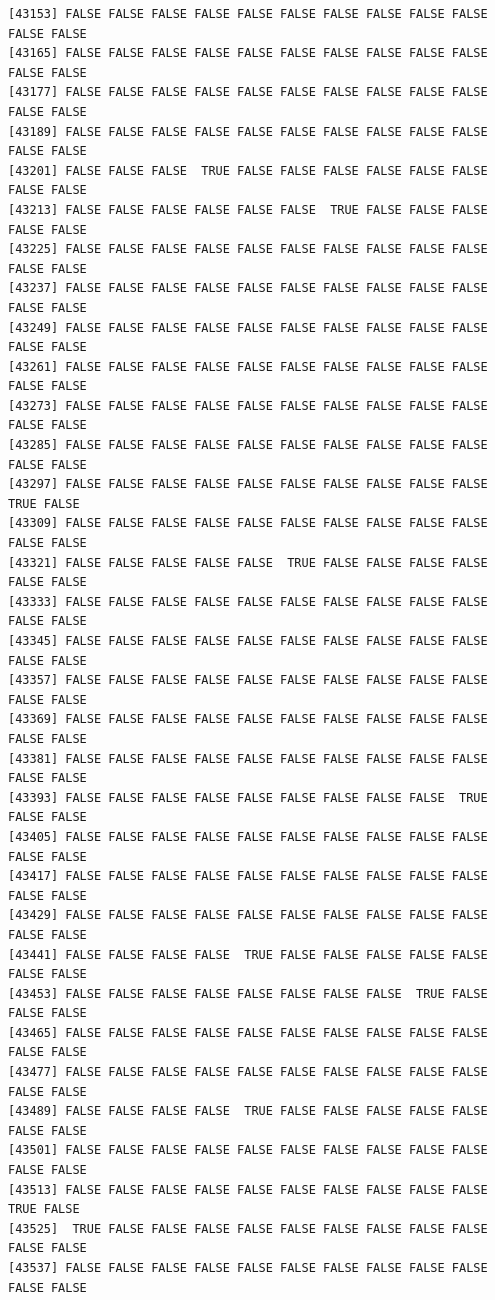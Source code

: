 \documentclass[
  a4paper,
  DIV=11,
  numbers=noendperiod]{scrartcl}
\begin{document}
\begin{verbatim}
[43153] FALSE FALSE FALSE FALSE FALSE FALSE FALSE FALSE FALSE FALSE FALSE FALSE
[43165] FALSE FALSE FALSE FALSE FALSE FALSE FALSE FALSE FALSE FALSE FALSE FALSE
[43177] FALSE FALSE FALSE FALSE FALSE FALSE FALSE FALSE FALSE FALSE FALSE FALSE
[43189] FALSE FALSE FALSE FALSE FALSE FALSE FALSE FALSE FALSE FALSE FALSE FALSE
[43201] FALSE FALSE FALSE  TRUE FALSE FALSE FALSE FALSE FALSE FALSE FALSE FALSE
[43213] FALSE FALSE FALSE FALSE FALSE FALSE  TRUE FALSE FALSE FALSE FALSE FALSE
[43225] FALSE FALSE FALSE FALSE FALSE FALSE FALSE FALSE FALSE FALSE FALSE FALSE
[43237] FALSE FALSE FALSE FALSE FALSE FALSE FALSE FALSE FALSE FALSE FALSE FALSE
[43249] FALSE FALSE FALSE FALSE FALSE FALSE FALSE FALSE FALSE FALSE FALSE FALSE
[43261] FALSE FALSE FALSE FALSE FALSE FALSE FALSE FALSE FALSE FALSE FALSE FALSE
[43273] FALSE FALSE FALSE FALSE FALSE FALSE FALSE FALSE FALSE FALSE FALSE FALSE
[43285] FALSE FALSE FALSE FALSE FALSE FALSE FALSE FALSE FALSE FALSE FALSE FALSE
[43297] FALSE FALSE FALSE FALSE FALSE FALSE FALSE FALSE FALSE FALSE  TRUE FALSE
[43309] FALSE FALSE FALSE FALSE FALSE FALSE FALSE FALSE FALSE FALSE FALSE FALSE
[43321] FALSE FALSE FALSE FALSE FALSE  TRUE FALSE FALSE FALSE FALSE FALSE FALSE
[43333] FALSE FALSE FALSE FALSE FALSE FALSE FALSE FALSE FALSE FALSE FALSE FALSE
[43345] FALSE FALSE FALSE FALSE FALSE FALSE FALSE FALSE FALSE FALSE FALSE FALSE
[43357] FALSE FALSE FALSE FALSE FALSE FALSE FALSE FALSE FALSE FALSE FALSE FALSE
[43369] FALSE FALSE FALSE FALSE FALSE FALSE FALSE FALSE FALSE FALSE FALSE FALSE
[43381] FALSE FALSE FALSE FALSE FALSE FALSE FALSE FALSE FALSE FALSE FALSE FALSE
[43393] FALSE FALSE FALSE FALSE FALSE FALSE FALSE FALSE FALSE  TRUE FALSE FALSE
[43405] FALSE FALSE FALSE FALSE FALSE FALSE FALSE FALSE FALSE FALSE FALSE FALSE
[43417] FALSE FALSE FALSE FALSE FALSE FALSE FALSE FALSE FALSE FALSE FALSE FALSE
[43429] FALSE FALSE FALSE FALSE FALSE FALSE FALSE FALSE FALSE FALSE FALSE FALSE
[43441] FALSE FALSE FALSE FALSE  TRUE FALSE FALSE FALSE FALSE FALSE FALSE FALSE
[43453] FALSE FALSE FALSE FALSE FALSE FALSE FALSE FALSE  TRUE FALSE FALSE FALSE
[43465] FALSE FALSE FALSE FALSE FALSE FALSE FALSE FALSE FALSE FALSE FALSE FALSE
[43477] FALSE FALSE FALSE FALSE FALSE FALSE FALSE FALSE FALSE FALSE FALSE FALSE
[43489] FALSE FALSE FALSE FALSE  TRUE FALSE FALSE FALSE FALSE FALSE FALSE FALSE
[43501] FALSE FALSE FALSE FALSE FALSE FALSE FALSE FALSE FALSE FALSE FALSE FALSE
[43513] FALSE FALSE FALSE FALSE FALSE FALSE FALSE FALSE FALSE FALSE  TRUE FALSE
[43525]  TRUE FALSE FALSE FALSE FALSE FALSE FALSE FALSE FALSE FALSE FALSE FALSE
[43537] FALSE FALSE FALSE FALSE FALSE FALSE FALSE FALSE FALSE FALSE FALSE FALSE

\end{verbatim}
\end{document}
